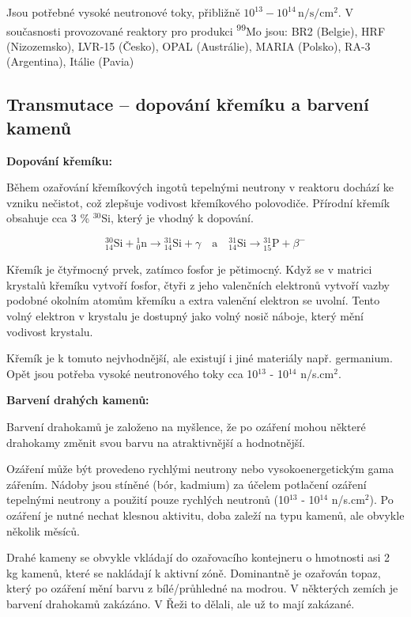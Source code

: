 Jsou potřebné vysoké neutronové toky, přibližně $10^{13} - 10^{14}\,\mathrm{n/s/cm^2}$. V současnosti provozované reaktory pro produkci \textsuperscript{99}Mo jsou: BR2 (Belgie), HRF (Nizozemsko), LVR-15 (Česko), OPAL (Austrálie), MARIA (Polsko), RA-3 (Argentina), Itálie (Pavia)

\subsection{Transmutace -- dopování křemíku a barvení kamenů}

\textbf{Dopování křemíku:}

Během ozařování křemíkových ingotů tepelnými neutrony v reaktoru dochází ke vzniku nečistot, což zlepšuje vodivost křemíkového polovodiče. Přírodní křemík obsahuje cca 3 \% $^{30}$Si, který je vhodný k dopování. 

 \[
{}^{30}_{14}\mathrm{Si} + {}^{1}_{0}\mathrm{n} \rightarrow {}^{31}_{14}\mathrm{Si} + \gamma
\quad \text{a} \quad
{}^{31}_{14}\mathrm{Si} \rightarrow {}^{31}_{15}\mathrm{P} + \beta^-
\]

Křemík je čtyřmocný prvek, zatímco fosfor je pětimocný. Když se v matrici krystalů křemíku vytvoří fosfor, čtyři z jeho valenčních elektronů vytvoří vazby podobné okolním atomům křemíku a extra valenční elektron se uvolní. Tento volný elektron v krystalu je dostupný jako volný nosič náboje, který mění vodivost krystalu.

Křemík je k tomuto nejvhodnější, ale existují i jiné materiály např. germanium. Opět jsou potřeba vysoké neutronového toky cca 10$^{13}$ - 10$^{14}$ n/s.cm$^2$. 

\textbf{Barvení drahých kamenů:}

Barvení drahokamů je založeno na myšlence, že po ozáření mohou některé drahokamy změnit svou barvu na atraktivnější a hodnotnější. 

Ozáření může být provedeno rychlými neutrony nebo vysokoenergetickým gama zářením. Nádoby jsou stíněné (bór, kadmium) za účelem potlačení ozáření tepelnými neutrony a použití pouze rychlých neutronů (10$^{13}$ - 10$^{14}$ n/s.cm$^2$). Po ozáření je nutné nechat klesnou aktivitu, doba zaleží na typu kamenů, ale obvykle několik měsíců.

Drahé kameny se obvykle vkládají do ozařovacího kontejneru o hmotnosti asi 2 kg kamenů, které se nakládají k aktivní zóně. Dominantně je ozařován topaz, který po ozáření mění barvu z bílé/průhledné na modrou. V některých zemích je barvení drahokamů zakázáno. V Řeži to dělali, ale už to mají zakázané.

